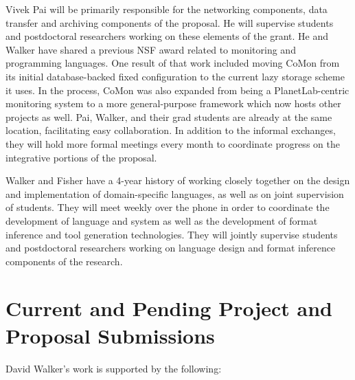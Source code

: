 \documentclass[12pt]{article}
\begin{document}
Vivek Pai will be primarily responsible for the networking components,
data transfer and archiving components of the proposal.  He will
supervise students and postdoctoral researchers working on these
elements of the grant.  He and Walker have shared a previous NSF award
related to monitoring and programming languages. One result of that
work included moving CoMon from its initial database-backed fixed
configuration to the current lazy storage scheme it uses. In the
process, CoMon was also expanded from being a PlanetLab-centric
monitoring system to a more general-purpose framework which now hosts
other projects as well. Pai, Walker, and their grad students are
already at the same location, facilitating easy collaboration. In
addition to the informal exchanges, they will hold more formal
meetings every month to coordinate progress on the integrative
portions of the proposal.

Walker and Fisher have a 4-year history of working closely together on
the design and implementation of domain-specific languages, as well as
on joint supervision of students.  They will meet weekly over the
phone in order to coordinate the development of \pads{} language and
system as well as the development of format inference and tool
generation technologies.  They will jointly supervise students and
postdoctoral researchers working on language design and format
inference components of the research.

\section{Current and Pending Project and Proposal Submissions}

David Walker's work is supported by the following:
\end{document}

